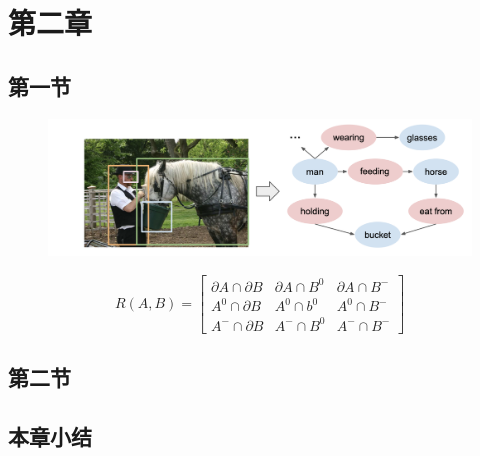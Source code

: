 
\chapter{第二章}
\section{第一节}

\begin{figure}[!htp]
    \centering
    \includegraphics[width=1.0\textwidth]{figures/第二章/场景图示例.png} \\
   \label{场景图示例}
\end{figure}

\begin{equation}
    R(A, B) = 
    \begin{bmatrix}
        \partial A \cap \partial B & \partial A \cap B^0 & \partial A \cap B^- \\
        A^0 \cap \partial B & A^0 \cap b^0 & A^0 \cap B^- \\
        A^- \cap \partial B & A^- \cap B^0 & A^- \cap B^-
    \end{bmatrix}
\end{equation}



\section{第二节}



\section{本章小结}
